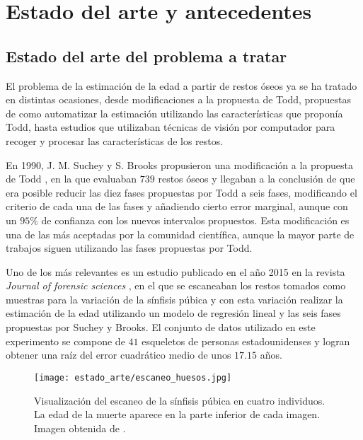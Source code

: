 \section{Estado del arte y antecedentes}

\subsection{Estado del arte del problema a tratar} \label{sec_estado_arte_problema}

El problema de la estimación de la edad a partir de restos óseos ya se ha tratado en distintas ocasiones, desde modificaciones a la propuesta de Todd, propuestas de como automatizar la estimación utilizando las características que proponía Todd, hasta estudios que utilizaban técnicas de visión por computador para recoger y procesar las características de los restos.

En 1990, J. M. Suchey y S. Brooks propusieron una modificación a la propuesta de Todd \cite{sucheyBrooks}, en la que evaluaban $739$ restos óseos y llegaban a la conclusión de que era posible reducir las diez fases propuestas por Todd a seis fases, modificando el criterio de cada una de las fases y añadiendo cierto error marginal, aunque con un $95\%$ de confianza con los nuevos intervalos propuestos. Esta modificación es una de las más aceptadas por la comunidad científica, aunque la mayor parte de trabajos siguen utilizando las fases propuestas por Todd.


Uno de los más relevantes es un estudio publicado en el año 2015 en la revista \textit{Journal of forensic sciences} \cite{modelandoHuesos3D}, en el que se escaneaban los restos tomados como muestras para la variación de la sínfisis púbica y con esta variación realizar la estimación de la edad utilizando un modelo de regresión lineal y las seis fases propuestas por Suchey y Brooks. El conjunto de datos utilizado en este experimento se compone de $41$ esqueletos de personas estadounidenses y logran obtener una raíz del error cuadrático medio de unos $17.15$ años.

\begin{figure}[H]
	\centering
	\texttt{[image: estado\_arte/escaneo\_huesos.jpg]}
	\caption{Visualización del escaneo de la sínfisis púbica en cuatro individuos. La edad de la muerte aparece en la parte inferior de cada imagen. Imagen obtenida de \cite{modelandoHuesos3D}.}
	\label{fig:escaneo_huesos}
\end{figure}

